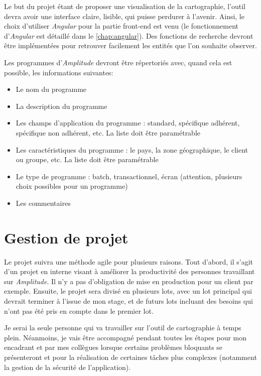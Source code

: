 \documentclass{polytech/polytech}
\begin{document}
Le but du projet étant de proposer une visualisation de la cartographie, l'outil devra avoir une interface claire, lisible, qui puisse perdurer à l'avenir. Ainsi, le choix d'utiliser \textit{Angular} pour la partie front-end est venu (le fonctionnement d'\textit{Angular} est détaillé dans le \autoref{chap:angular}). Des fonctions de recherche devront être implémentées pour retrouver facilement les entités que l'on souhaite observer.

Les programmes d'\textit{Amplitude} devront être répertoriés avec, quand cela est possible, les informations suivantes:

\begin{itemize}
	\item Le nom du programme
	\item La description du programme
	\item Les champs d’application du programme : standard, spécifique adhérent, spécifique non adhérent, etc. La liste doit être paramétrable
	\item Les caractéristiques du programme : le pays, la zone géographique, le client ou groupe, etc. La liste doit être paramétrable
	\item Le type de programme : batch, transactionnel, écran (attention, plusieurs choix possibles pour un programme)
	\item Les commentaires
\end{itemize}


\section{Gestion de projet}

Le projet suivra une méthode agile pour plusieurs raisons. Tout d'abord, il s'agit d'un projet en interne visant à améliorer la productivité des personnes travaillant sur \textit{Amplitude}. Il n'y a pas d'obligation de mise en production pour un client par exemple. Ensuite, le projet sera divisé en plusieurs lots, avec un lot principal qui devrait terminer à l'issue de mon stage, et de futurs lots incluant des besoins qui n'ont pas été pris en compte dans le premier lot.  

Je serai la seule personne qui va travailler sur l'outil de cartographie à temps plein. Néanmoins, je vais être accompagné pendant toutes les étapes pour mon encadrant et par mes collègues lorsque certains problèmes bloquants se présenteront et pour la réalisation de certaines tâches plus complexes (notamment la gestion de la sécurité de l'application).
\end{document}
